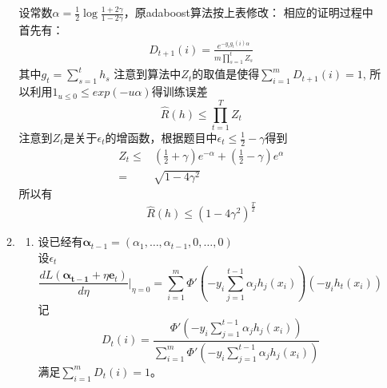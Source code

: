 \documentclass[a4paper]{article}
\begin{document}
\begin{enumerate}[label=\arabic*.]
\begin{enumerate}[label*=\arabic*.]
         设常数$\alpha=\frac{1}{2}\log\frac{1+2\gamma}{1-2\gamma}$，原adaboost算法按上表修改：
            相应的证明过程中首先有：
            \begin{align}
            D_{t+1}(i)=\frac{e^{-y_i g_t(i)\alpha}}{m\prod_{s=1}^t Z_s}
            \end{align}
            其中$g_t=\sum_{s=1}^t h_s$
            注意到算法中$Z_t$的取值是使得$\sum_{i=1}^m D_{t+1}(i)=1$,
            所以利用$1_{u\leq 0}\leq exp(-u\alpha)$得训练误差
            \begin{equation}
            \hat{R}(h)\leq \prod_{t=1}^T Z_t
            \end{equation}
         注意到$Z_t$是关于$\epsilon_t$的增函数，根据题目中$\epsilon_t\leq \frac{1}{2}-\gamma$得到
            \begin{align}
                Z_t\leq &(\frac{1}{2}+\gamma)e^{-\alpha}+(\frac{1}{2}-\gamma)e^{\alpha}\\
                = & \sqrt{1-4\gamma^2}
            \end{align}
            所以有
            \begin{equation}
            \hat{R}(h)\leq (1-4\gamma^2)^{\frac{T}{2}}
            \end{equation}            
        \item
        \begin{enumerate}[label=(\alph*)]
            \item 设已经有$\bm{\alpha}_{t-1}=(\alpha_1,\dots,\alpha_{t-1},0,\dots,0)$
            \begin{equation}
            \end{equation}            
            设$\epsilon_t$
            \begin{equation}
            \frac{d L(\bm{\alpha_{t-1}}+\eta \bm{e}_t)}{d\eta}|_{\eta=0}=\sum_{i=1}^m \Phi'(-y_i \sum_{j=1}^{t-1} \alpha_j h_j(x_i))(-y_i h_t(x_i))
            \end{equation}
            记
            \begin{equation}
            D_t(i)=\frac{\Phi'(-y_i \sum_{j=1}^{t-1}\alpha_j h_j(x_i))}{\sum_{i=1}^m\Phi'(-y_i \sum_{j=1}^{t-1}\alpha_j h_j(x_i))}
            \end{equation}            
            满足$\sum_{i=1}^m D_t(i)=1$。
            

\end{enumerate}
\end{enumerate}
\end{enumerate}
\end{document}
